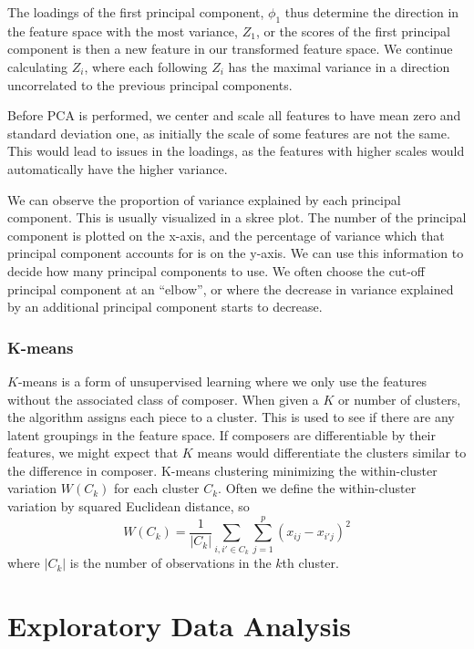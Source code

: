 \documentclass[12pt,twoside]{reedthesis}
\theoremstyle{definition}
\theoremstyle{definition}
\theoremstyle{definition}
\theoremstyle{remark}
\begin{document}
The loadings of the first principal component, \(\phi_1\) thus determine
the direction in the feature space with the most variance, \(Z_1\), or
the scores of the first principal component is then a new feature in our
transformed feature space. We continue calculating \(Z_i\), where each
following \(Z_i\) has the maximal variance in a direction uncorrelated
to the previous principal components.

Before PCA is performed, we center and scale all features to have mean
zero and standard deviation one, as initially the scale of some features
are not the same. This would lead to issues in the loadings, as the
features with higher scales would automatically have the higher
variance.

We can observe the proportion of variance explained by each principal
component. This is usually visualized in a skree plot. The number of the
principal component is plotted on the x-axis, and the percentage of
variance which that principal component accounts for is on the y-axis.
We can use this information to decide how many principal components to
use. We often choose the cut-off principal component at an ``elbow'', or
where the decrease in variance explained by an additional principal
component starts to decrease.

\subsection{K-means}\label{k-means}

\(K\)-means is a form of unsupervised learning where we only use the
features without the associated class of composer. When given a \(K\) or
number of clusters, the algorithm assigns each piece to a cluster. This
is used to see if there are any latent groupings in the feature space.
If composers are differentiable by their features, we might expect that
\(K\) means would differentiate the clusters similar to the difference
in composer. K-means clustering minimizing the within-cluster variation
\(W(C_k)\) for each cluster \(C_k\). Often we define the within-cluster
variation by squared Euclidean distance, so
\[W(C_k) = \frac{1}{|C_k|} \sum_{i,i' \in C_k}\sum_{j = 1}^p (x_{ij} - x_{i'j})^2 \]
where \(|C_k|\) is the number of observations in the \(k\)th cluster.

\chapter{Exploratory Data Analysis}\label{exploratory-data-analysis}
\end{document}
